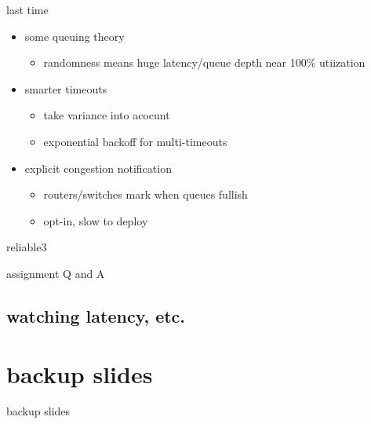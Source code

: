 \date{}
\title{}
\date{}
\usepackage{pgfplots}
\pgfplotsset{compat=1.16}

\begin{frame}
    \titlepage
\end{frame}

\begin{frame}{last time}
    \begin{itemize}
    \item some queuing theory
        \begin{itemize}
        \item randomness means huge latency/queue depth near 100\% utiization
        \end{itemize}
    \item smarter timeouts
        \begin{itemize}
        \item take variance into acocunt
        \item exponential backoff for multi-timeouts
        \end{itemize}
    \item explicit congestion notification
        \begin{itemize}
        \item routers/switches mark when queues fullish
        \item opt-in, slow to deploy
        \end{itemize}
    \end{itemize}
\end{frame}

\begin{frame}{reliable3}
\end{frame}

\begin{frame}{assignment Q and A}
\end{frame}


\subsection{watching latency, etc.}








\section{backup slides}
\begin{frame}{backup slides}
\end{frame}


